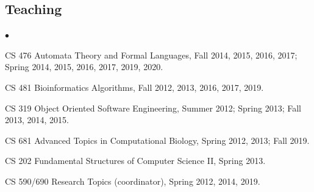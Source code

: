 \documentclass[margin,line]{res}
\newenvironment{list2}{
  \begin{list}{$\bullet$}{%
      \setlength{\itemsep}{0.1cm}
      \setlength{\parsep}{0in} \setlength{\parskip}{0in}
      \setlength{\topsep}{0in} \setlength{\partopsep}{0in} 
      \setlength{\leftmargin}{0.2in}}}{\end{list}}
\begin{document}
\begin{resume}
\vspace{-0.4cm}
\subsection{\small \sc Teaching}
\begin{list2}
  \item CS 476 Automata Theory and Formal Languages, Fall 2014, 2015, 2016, 2017; Spring 2014, 2015, 2016, 2017, 2019, 2020. 
  \item CS 481 Bioinformatics Algorithms, Fall 2012, 2013, 2016, 2017, 2019.
  \item CS 319 Object Oriented Software Engineering, Summer 2012; Spring 2013; Fall 2013, 2014, 2015.
  \item CS 681 Advanced Topics in Computational Biology, Spring 2012, 2013; Fall 2019.
  \item CS 202 Fundamental Structures of Computer Science II, Spring 2013.
  \item CS 590/690 Research Topics (coordinator), Spring 2012, 2014, 2019.
\end{list2}


\vspace{-0.4cm}

\end{resume}
\end{document}
